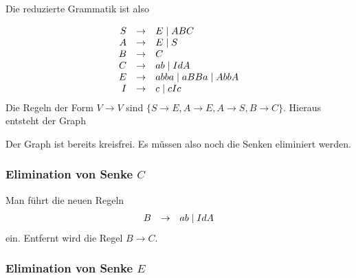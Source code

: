 \documentclass{article}
\begin{document}
Die reduzierte Grammatik ist also 

\begin{equation*}
   \begin{array}{rcl}
      S & \rightarrow & E \mid ABC \\
      A & \rightarrow & E \mid S \\
      B & \rightarrow & C \\
      C & \rightarrow & ab \mid IdA \\
      E & \rightarrow & abba \mid aBBa \mid AbbA \\
      I & \rightarrow & c \mid cIc
   \end{array}
\end{equation*}
Die Regeln der Form $V \rightarrow V$ sind $\{S\rightarrow E, A \rightarrow E, A
\rightarrow S, B \rightarrow C\}$. Hieraus entsteht der Graph

\usetikzlibrary{arrows,automata,positioning}

\begin{center}
\end{center}

Der Graph ist bereits kreisfrei. Es müssen also noch die Senken eliminiert
werden.

\subsubsection{Elimination von Senke $C$}

Man führt die neuen Regeln
\begin{equation*}
   \begin{array}{rcl}
      B & \rightarrow & ab \mid IdA
   \end{array}
\end{equation*}
ein. Entfernt wird die Regel $B \rightarrow C$.

\subsubsection{Elimination von Senke $E$}
\end{document}
